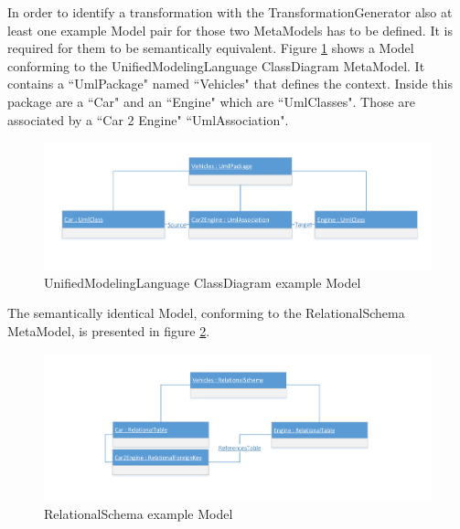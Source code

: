 In order to identify a transformation with the \gls{TransformationGenerator} also at least one example \gls{Model} pair for those two \glspl{MetaModel} has to be defined. It is required for them to be semantically equivalent. Figure \ref{figScenarioStructuralSimpleUmlClassModel1} shows a \gls{Model} conforming to the \Gls{UnifiedModelingLanguage} \gls{ClassDiagram} \gls{MetaModel}. It contains a ``UmlPackage" named ``Vehicles" that defines the context. Inside this package are a ``Car" and an ``Engine" which are ``UmlClasses". Those are associated by a ``Car 2 Engine" ``UmlAssociation". 

\begin{figure}[htb]
	\centering
	\includegraphics[scale=0.6, trim=0cm 1cm 0cm 1cm, clip=true]{Images/ScenarioStructuralSimpleUmlClassModel1.pdf} 
	\caption{\Gls{UnifiedModelingLanguage} \gls{ClassDiagram} example \gls{Model}}
	\label{figScenarioStructuralSimpleUmlClassModel1}
\end{figure}

The semantically identical \gls{Model}, conforming to the \gls{RelationalSchema} \gls{MetaModel}, is presented in figure \ref{figScenarioStructuralSimpleRelationalModel1}.


\begin{figure}[htb]
	\centering
	\includegraphics[scale=0.6, trim=0cm 1cm 0cm 1cm, clip=true]{Images/ScenarioStructuralSimpleRelationalModel1.pdf} 
	\caption{\Gls{RelationalSchema} example \gls{Model}}
	\label{figScenarioStructuralSimpleRelationalModel1}
\end{figure}


